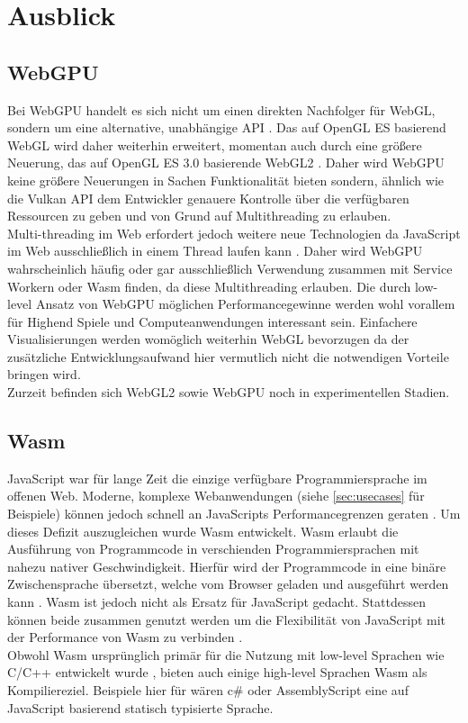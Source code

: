 \section{Ausblick}
\subsection{WebGPU}
Bei WebGPU handelt es sich nicht um einen direkten Nachfolger für WebGL, sondern um eine alternative, unabhängige API \cite{WebGPUIntro}. Das auf OpenGL ES basierend WebGL wird daher weiterhin erweitert, momentan auch durch eine größere Neuerung, das auf OpenGL ES 3.0 basierende WebGL2 \cite{WebGL2}. Daher wird WebGPU keine größere Neuerungen in Sachen Funktionalität bieten sondern, ähnlich wie die Vulkan API dem Entwickler genauere Kontrolle über die verfügbaren Ressourcen zu geben und von Grund auf Multithreading zu erlauben. \\
Multi-threading im Web erfordert jedoch weitere neue Technologien da JavaScript im Web ausschließlich in einem Thread laufen kann \cite{JSConcurrency}. Daher wird WebGPU wahrscheinlich häufig oder gar ausschließlich Verwendung zusammen mit Service Workern oder \ac{Wasm} finden, da diese Multithreading erlauben.
Die durch low-level Ansatz von WebGPU möglichen Performancegewinne werden wohl vorallem für Highend Spiele und Computeanwendungen interessant sein. Einfachere Visualisierungen werden womöglich weiterhin WebGL bevorzugen da der zusätzliche Entwicklungsaufwand hier vermutlich nicht die notwendigen Vorteile bringen wird. \\
Zurzeit befinden sich WebGL2 sowie WebGPU noch in experimentellen Stadien.
\subsection{\acf{Wasm}}
JavaScript war für lange Zeit die einzige verfügbare Programmiersprache im offenen Web. Moderne, komplexe Webanwendungen (siehe \ref{sec:usecases} für Beispiele) können jedoch schnell an JavaScripts Performancegrenzen geraten \cite{haas2017bringing}. Um dieses Defizit auszugleichen wurde \ac{Wasm} entwickelt. \ac{Wasm} erlaubt die Ausführung von Programmcode in verschienden Programmiersprachen mit nahezu nativer Geschwindigkeit. Hierfür wird der Programmcode in eine binäre Zwischensprache übersetzt, welche vom Browser geladen und ausgeführt werden kann \cite{WasmMDN}. \ac{Wasm} ist jedoch nicht als Ersatz für JavaScript gedacht. Stattdessen können beide zusammen genutzt werden um die Flexibilität von JavaScript mit der Performance von \ac{Wasm} zu verbinden \cite{WasmMDN}. \\
Obwohl \ac{Wasm} ursprünglich primär für die Nutzung mit low-level Sprachen wie C/C++ entwickelt wurde \cite{WasmMDN}, bieten auch einige high-level Sprachen \ac{Wasm} als Kompiliereziel. Beispiele hier für wären c\# \cite{dotnetWASM} oder AssemblyScript eine auf JavaScript basierend statisch typisierte Sprache\cite{AsmScript}.
